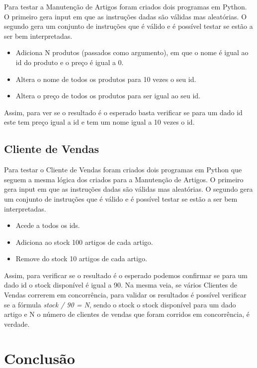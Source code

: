 \documentclass[a4paper]{report}
\begin{document}
Para testar a Manutenção de Artigos foram criados dois programas em Python.
O primeiro gera input em que as instruções dadas são válidas mas aleatórias.
O segundo gera um conjunto de instruções que é válido e é possível testar se estão
a ser bem interpretadas.
\begin{itemize} 
    \item Adiciona N produtos (passados como argumento), em que o nome é igual ao id do
        produto e o preço é igual a 0.
    \item Altera o nome de todos os produtos para 10 vezes o seu id.
    \item Altera o preço de todos os produtos para ser igual ao seu id.
\end{itemize}
Assim, para ver se o resultado é o esperado basta verificar se para um dado id
este tem preço igual a id e tem um nome igual a 10 vezes o id.

\section{Cliente de Vendas}

Para testar o Cliente de Vendas foram criados dois programas em Python que
seguem a mesma lógica dos criados para a Manutenção de Artigos.
O primeiro gera input em que as instruções dadas são válidas mas aleatórias.
O segundo gera um conjunto de instruções que é válido e é possível testar se estão
a ser bem interpretadas.
\begin{itemize} 
    \item Acede a todos os ids.
    \item Adiciona ao stock 100 artigos de cada artigo.
    \item Remove do stock 10 artigos de cada artigo.
\end{itemize}
Assim, para verificar se o resultado é o esperado podemos confirmar se para um dado
id o stock disponível é igual a 90.
Na mesma veia, se vários Clientes de Vendas correrem em concorrência, para validar
os resultados é possível verificar se a fórmula \textit{stock / 90 = N}, sendo o stock o stock
disponível para um dado artigo e N o número de clientes de vendas que foram corridos
em concorrência, é verdade.

\chapter{Conclusão}
\end{document}
